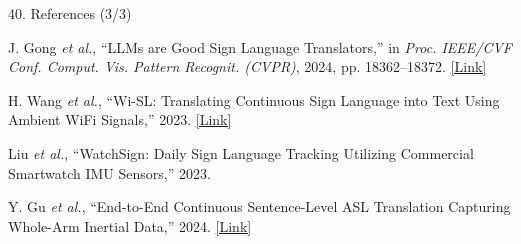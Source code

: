 \documentclass[aspectratio=169,11pt,xcolor=table]{beamer}
\begin{document}
\begin{frame}{40. References (3/3)}

\footnotesize
\color{black}
\raggedright

\begin{list}
    {}
    {
        \setlength{\leftmargin}{0.45cm}
        \setlength{\labelwidth}{0cm}
        \setlength{\labelsep}{0.10cm}
        \setlength{\itemsep}{8pt}
        \setlength{\parsep}{0pt}
        \setlength{\topsep}{0pt}
    }

\item[\textbf{[9]}]
J. Gong \emph{et al.}, ``LLMs are Good Sign Language Translators,''
in \emph{Proc. IEEE/CVF Conf. Comput. Vis. Pattern Recognit. (CVPR)},
2024, pp. 18362--18372.
\hspace{2pt}
\href{https://openaccess.thecvf.com/content/CVPR2024/html/Gong_LLMs_are_Good_Sign_Language_Translators_CVPR_2024_paper.html}
{\textcolor{AmritaMaroon}{[Link]}}

\item[\textbf{[10]}]
H. Wang \emph{et al.}, ``Wi-SL: Translating Continuous Sign Language
into Text Using Ambient WiFi Signals,'' 2023.
\hspace{2pt}
\href{https://www.mdpi.com/1424-8220/20/14/4025}
{\textcolor{AmritaMaroon}{[Link]}}

\item[\textbf{[11]}]
Liu \emph{et al.}, ``WatchSign: Daily Sign Language Tracking Utilizing
Commercial Smartwatch IMU Sensors,'' 2023.

\item[\textbf{[12]}]
Y. Gu \emph{et al.}, ``End-to-End Continuous Sentence-Level ASL
Translation Capturing Whole-Arm Inertial Data,'' 2024.
\hspace{2pt}
\href{https://www.mdpi.com/1424-8220/24/2/453}
{\textcolor{AmritaMaroon}{[Link]}}

\end{list}

\end{frame}
\end{document}
